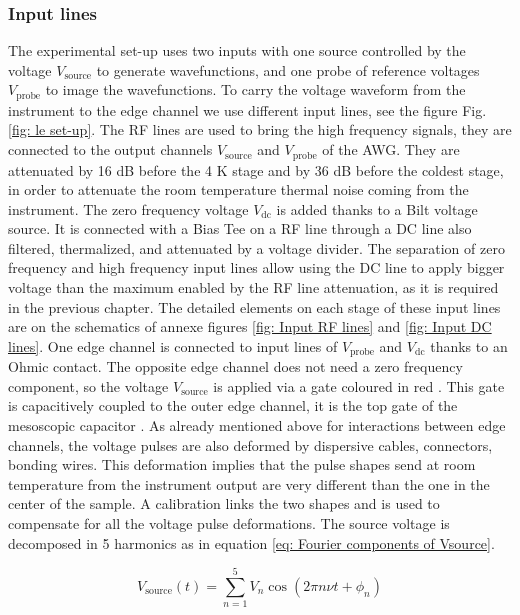 \subsubsection*{Input lines}

The experimental set-up uses two inputs with one source controlled by the voltage $V_{\mathrm{source}}$ to generate wavefunctions, and one probe of reference voltages $V_{\mathrm{probe}}$ to image the wavefunctions.
To carry the voltage waveform from the instrument to the edge channel we use different input lines, see the figure Fig. \ref{fig: le set-up}.
The RF lines are used to bring the high frequency signals, they are connected to the output channels $V_{\mathrm{source}}$ and $V_{\mathrm{probe}}$ of the AWG.
They are attenuated by 16 dB before the 4 K stage and by 36 dB before the coldest stage, in order to attenuate the room temperature thermal noise coming from the instrument.
The zero frequency voltage $V_{\mathrm{dc}}$ is added thanks to a Bilt voltage source.
It is connected with a Bias Tee on a RF line through a DC line also filtered, thermalized, and attenuated by a voltage divider.
The separation of zero frequency and high frequency input lines allow using the DC line to apply bigger voltage than the maximum enabled by the RF line attenuation, as it is required in the previous chapter.
The detailed elements on each stage of these input lines are on the schematics of annexe figures \ref{fig: Input RF lines} and \ref{fig: Input DC lines}.
One edge channel is connected to input lines of $V_{\mathrm{probe}}$ and $V_{\mathrm{dc}}$ thanks to an Ohmic contact.
The opposite edge channel does not need a zero frequency component, so the voltage $V_{\mathrm{source}}$ is applied via a gate coloured in red \cite{misiorny2018shaping}.
This gate is capacitively coupled to the outer edge channel, it is the top gate of the mesoscopic capacitor \cite{gabelli2006violation}.
As already mentioned above for interactions between edge channels, the voltage pulses are also deformed by dispersive cables, connectors, bonding wires.
This deformation implies that the pulse shapes send at room temperature from the instrument output are very different than the one in the center of the sample.
A calibration links the two shapes and is used to compensate for all the voltage pulse deformations.
The source voltage is decomposed in 5 harmonics as in equation \eqref{eq: Fourier components of Vsource}.

\begin{equation}
V_{\mathrm{source}}\left(t\right) = \sum_{n=1}^{5} V_{n}\cos\left(2\pi n\nu t+\phi_{n}\right) \label{eq: Fourier components of Vsource}
\end{equation}

